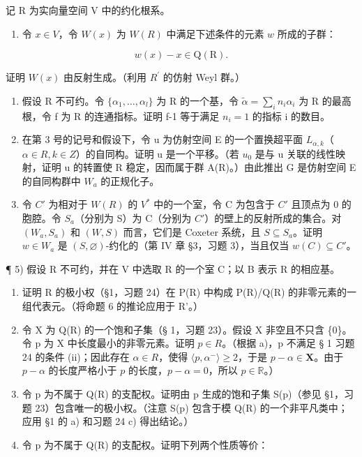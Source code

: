 
记 R 为实向量空间 V 中的约化根系。

\begin{enumerate}
\def\labelenumi{\arabic{enumi})}
\tightlist
\item
  令 \(x \in V\)，令 \(W(x)\) 为 \(W(R)\) 中满足下述条件的元素 \(w\) 所成的子群：
\end{enumerate}

\[
w (x) - x \in \mathrm{Q} (\mathrm{R}).
\]

证明 \(W(x)\) 由反射生成。（利用 \(R^{\prime}\) 的仿射 Weyl 群。）

\begin{enumerate}
\def\labelenumi{\arabic{enumi})}
\setcounter{enumi}{1}
\item
  假设 R 不可约。令 \(\{\alpha_{1},\ldots,\alpha_{l}\}\) 为 R 的一个基，令 \(\tilde{\alpha}=\sum_{i}n_{i}\alpha_{i}\) 为 R 的最高根，令 f 为 R 的连通指标。证明 f-1 等于满足 \(n_{i}=1\) 的指标 i 的数目。
\item
  在第 3 号的记号和假设下，令 u 为仿射空间 E 的一个置换超平面 \(L_{\alpha,k}\)（\(\alpha \in R, k \in Z\)）的自同构。证明 u 是一个平移。（若 \(u_{0}\) 是与 u 关联的线性映射，证明 u 的转置使 R 稳定，因而属于群 A(R)。）由此推出 G 是仿射空间 E 的自同构群中 \(W_{a}\) 的正规化子。
\item
  令 \(C'\) 为相对于 \(W(R)\) 的 \(V^{*}\) 中的一个室，令 C 为包含于 \(C'\) 且顶点为 0 的胞腔。令 \(S_{a}\)（分别为 S）为 C（分别为 \(C'\)）的壁上的反射所成的集合。对 \((W_{a}, S_{a})\) 和 \((W, S)\) 而言，它们是 Coxeter 系统，且 \(S \subseteq S_{a}\)。证明 \(w \in W_{a}\) 是 \((S, \varnothing)\)-约化的（第 IV 章 §3，习题 3），当且仅当 \(w(C) \subseteq C'\)。
\end{enumerate}

¶ 5) 假设 R 不可约，并在 V 中选取 R 的一个室 C；以 B 表示 R 的相应基。

\begin{enumerate}
\def\labelenumi{\alph{enumi})}
\item
  证明 R 的极小权（§1，习题 24）在 P(R) 中构成 P(R)/Q(R) 的非零元素的一组代表元。（将命题 6 的推论应用于 R'。）
\item
  令 X 为 Q(R) 的一个饱和子集（§ 1，习题 23）。假设 X 非空且不只含 \{0\}。令 p 为 X 中长度最小的非零元素。证明 \(p \in R\)。（根据 a)，p 不满足 § 1 习题 24 的条件 (ii)；因此存在 \(\alpha \in R\)，使得 \(\langle p, \alpha^{-} \rangle \geqslant 2\)，于是 \(p - \alpha \in \mathbf{X}\)。由于 \(p - \alpha\) 的长度严格小于 \(p\) 的长度，\(p - \alpha = 0\)，所以 \(p \in \mathbb{R}\)。）
\item
  令 p 为不属于 Q(R) 的支配权。证明由 p 生成的饱和子集 S(p)（参见 §1，习题 23）包含唯一的极小权。（注意 S(p) 包含于模 Q(R) 的一个非平凡类中；应用 §1 的 a) 和习题 24 c) 得出结论。）
\item
  令 p 为不属于 Q(R) 的支配权。证明下列两个性质等价：
\end{enumerate}

